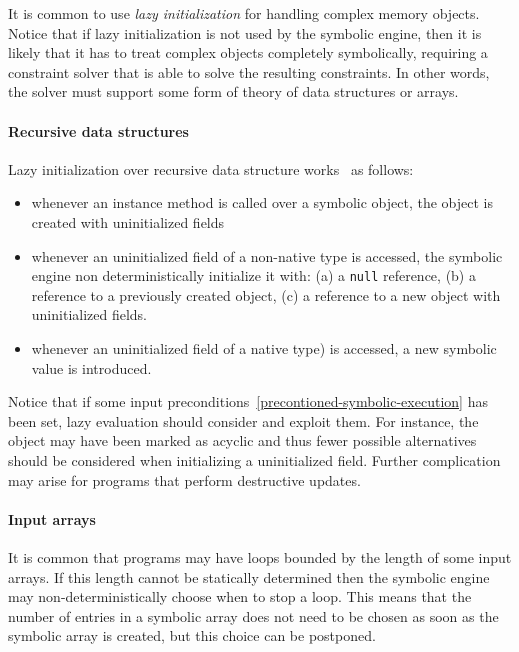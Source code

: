 It is common to use {\em lazy initialization} for handling complex memory objects. Notice that if lazy initialization is not used by the symbolic engine, then it is likely that it has to treat complex objects completely symbolically, requiring a constraint solver that is able to solve the resulting constraints. In other words, the solver must support some form of theory of data structures or arrays.

\paragraph{Recursive data structures} Lazy initialization over recursive data structure works~\cite{PV-JSTTT09} as follows:
\begin{itemize}
  \item whenever an instance method is called over a symbolic object, the object is created with uninitialized fields
  \item whenever an uninitialized field of a non-native type is accessed, the symbolic engine non deterministically initialize it with: (a) a {\tt null} reference, (b) a reference to a previously created object, (c) a reference to a new object with uninitialized fields. 
  \item whenever an uninitialized field of a native type) is accessed, a new symbolic value is introduced. 
\end{itemize}


Notice that if some input preconditions~\ref{precontioned-symbolic-execution} has been set, lazy evaluation should consider and exploit them. For instance, the object may have been marked as acyclic and thus fewer possible alternatives should be considered when initializing a uninitialized field. Further complication~\cite{PV-JSTTT09} may arise for programs that perform destructive updates. 

\paragraph{Input arrays}
It is common that programs may have loops bounded by the length of some input arrays. If this length cannot be statically determined then the symbolic engine may non-deterministically choose when to stop a loop. This means that the number of entries in a symbolic array does not need to be chosen as soon as the symbolic array is created, but this choice can be postponed.

